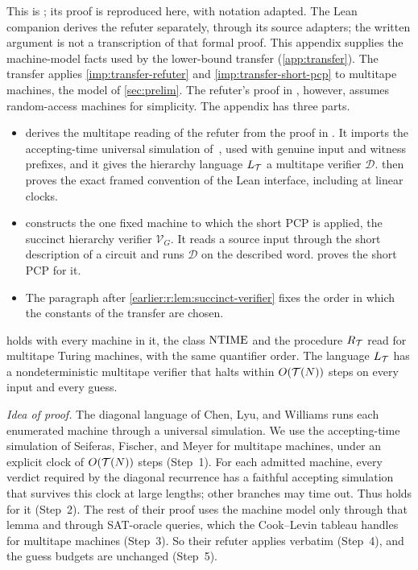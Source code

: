 This is \cite[Appendix~C]{NagCG}; its proof is reproduced here, with notation adapted. The Lean companion derives the refuter separately, through its source adapters; the written argument is not a transcription of that formal proof. This appendix supplies the machine-model facts used by the lower-bound
transfer (\cref{app:transfer}). The transfer applies \cref{imp:transfer-refuter} and \cref{imp:transfer-short-pcp} to
multitape machines, the model of \cref{sec:prelim}. The refuter's
proof in \cite[Section~4]{CLW20}, however, assumes random-access
machines for simplicity. The appendix has three parts.
\begin{itemize}
\item {} derives the multitape reading of the
refuter from the proof in \cite[Section~4]{CLW20}. It imports the
accepting-time universal simulation of~\cite{SFM78,BGW70}, used with
genuine input and witness prefixes, and it gives
the hierarchy language \(L_{\mathcal T}\) a multitape verifier
\(\mathcal D\).  then proves the exact framed
convention of the Lean interface, including at linear clocks.
\item {} constructs the one fixed machine to
which the short PCP is applied, the succinct hierarchy verifier
\(\mathcal V_G\). It reads a source input through the short description
of a circuit and runs \(\mathcal D\) on the described word.
 proves the short PCP for it.
\item The paragraph after \cref{earlier:r:lem:succinct-verifier} fixes the order
in which the constants of the transfer are chosen.
\end{itemize}

\begin{lemma}\label{earlier:r:lem:multitape-refuter}\label{earlier:g:lem:multitape-refuter}
 holds with every machine in it, the class
\(\mathrm{NTIME}\) and the procedure \(R_{\mathcal T}\) read for multitape Turing
machines, with the same quantifier order. The language \(L_{\mathcal T}\) has a
nondeterministic multitape verifier that halts within \(O(\mathcal T(N))\)
steps on every input and every guess.
\end{lemma}

\emph{Idea of proof.} The diagonal language of Chen, Lyu, and Williams
runs each enumerated machine through a universal simulation. We use the
accepting-time simulation of Seiferas, Fischer, and Meyer for multitape
machines, under an explicit clock of \(O(\mathcal T(N))\) steps (Step~1).
For each admitted machine, every verdict required by the diagonal
recurrence has a faithful accepting simulation that survives this
clock at large lengths; other branches may time out. Thus
\cite[Lemma~4.3]{CLW20} holds for it (Step~2). The rest
of their proof uses the machine model only through that lemma and
through SAT-oracle queries, which the Cook--Levin tableau handles for
multitape machines (Step~3). So their refuter applies verbatim
(Step~4), and the guess budgets are unchanged (Step~5).

